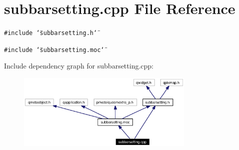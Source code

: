 \section{subbarsetting.cpp File Reference}
\label{subbarsetting_8cpp}


{\tt \#include \char`\"{}subbarsetting.h\char`\"{}}\par
{\tt \#include \char`\"{}subbarsetting.moc\char`\"{}}\par


Include dependency graph for subbarsetting.cpp:\begin{figure}[H]
\begin{center}
\leavevmode
\includegraphics[width=240pt]{subbarsetting_8cpp__incl}
\end{center}
\end{figure}

